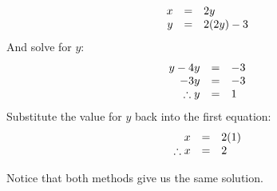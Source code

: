 \begin{equation*}
\begin{array}{ccl}\hfill x& =& 2y\hfill \\
 \hfill y& =& 2(2y)-3\hfill 
\end{array}
\end{equation*}
And solve for $y$:
\begin{equation*}
\begin{array}{ccl}
 \hfill y-4y& =& -3\hfill \\
 \hfill -3y& =& -3\hfill \\ 
\hfill \therefore y& =& 1\hfill 
\end{array}
\end{equation*}
Substitute the value for $y$ back into the first equation:
\begin{equation*}
\begin{array}{ccl}
 \hfill x& =& 2(1)\hfill \\
 \therefore x&=& 2\hfill \end{array}
\end{equation*}

Notice that both methods give us the same solution.

